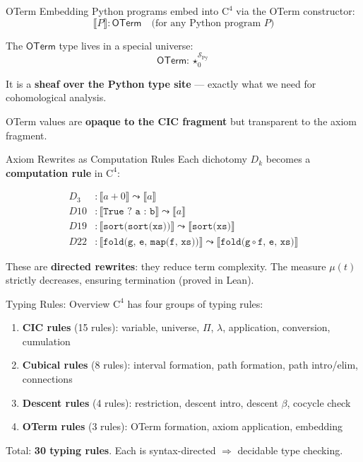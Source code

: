 \documentclass[aspectratio=169,11pt]{beamer}
\newcommand{\Cfour}{\mathrm{C}^4}
\newcommand{\OTerm}{\mathsf{OTerm}}
\newcommand{\site}{\mathcal{S}}
\newcommand{\den}[1]{\llbracket #1 \rrbracket}
\begin{document}
\begin{frame}{OTerm Embedding}
Python programs embed into $\Cfour$ via the OTerm constructor:
\[
\den{P} : \OTerm \quad \text{(for any Python program $P$)}
\]

\vspace{0.5em}
The $\OTerm$ type lives in a special universe:
\[
\OTerm : \star_0^{\site_{\text{Py}}}
\]

\vspace{0.3em}
It is a \textbf{sheaf over the Python type site} --- exactly what we need for cohomological analysis.

\vspace{0.5em}
OTerm values are \textbf{opaque to the CIC fragment} but transparent to the axiom fragment.
\end{frame}

\begin{frame}{Axiom Rewrites as Computation Rules}
Each dichotomy $D_k$ becomes a \textbf{computation rule} in $\Cfour$:

\vspace{0.5em}
\begin{align*}
D_3 &: \den{a + 0} \leadsto \den{a} \\
D10 &: \den{\texttt{True ? a : b}} \leadsto \den{a} \\
D19 &: \den{\texttt{sort(sort(xs))}} \leadsto \den{\texttt{sort(xs)}} \\
D22 &: \den{\texttt{fold(g, e, map(f, xs))}} \leadsto \den{\texttt{fold(g} \circ \texttt{f, e, xs)}}
\end{align*}

\vspace{0.5em}
These are \textbf{directed rewrites}: they reduce term complexity. The measure $\mu(t)$ strictly decreases, ensuring termination (proved in Lean).
\end{frame}

\begin{frame}{Typing Rules: Overview}
$\Cfour$ has four groups of typing rules:

\vspace{0.5em}
\begin{enumerate}
\item \textbf{CIC rules} (15 rules): variable, universe, $\Pi$, $\lambda$, application, conversion, cumulation
\item \textbf{Cubical rules} (8 rules): interval formation, path formation, path intro/elim, connections
\item \textbf{Descent rules} (4 rules): restriction, descent intro, descent $\beta$, cocycle check
\item \textbf{OTerm rules} (3 rules): OTerm formation, axiom application, embedding
\end{enumerate}

\vspace{0.5em}
Total: \textbf{30 typing rules}. Each is syntax-directed $\Rightarrow$ decidable type checking.
\end{frame}
\end{document}
